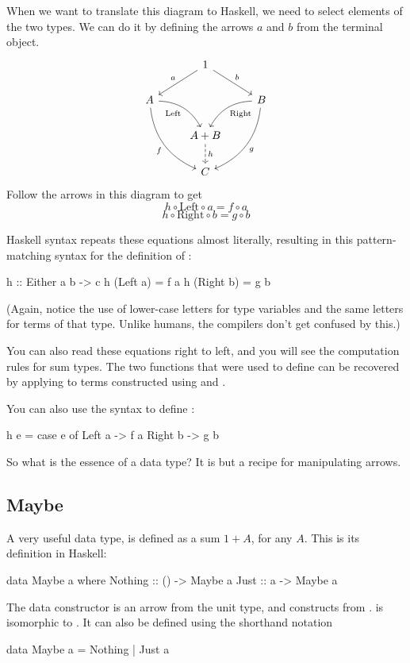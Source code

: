 \documentclass[DaoFP]{subfiles}
\begin{document}
When we want to translate this diagram to Haskell, we need to select elements of the two types. We can do it by defining the arrows $a$ and $b$ from the terminal object. 
\[
 \begin{tikzcd}
 &1
 \arrow[ld, "a"']
 \arrow[rd, "b"]
 \\
 A
 \arrow[dr,  bend left, "\text{Left}"']
 \arrow[ddr, bend right, "f"']
 && B
 \arrow[dl, bend right, "\text{Right}"]
 \arrow[ddl, bend left, "g"]
 \\
&A + B
\arrow[d, dashed, "h"]
\\
& C
 \end{tikzcd}
\]
Follow the arrows in this diagram to get
\[h \circ \text{Left} \circ a = f \circ a\]
\[h \circ \text{Right} \circ b = g \circ b\]

Haskell syntax repeats these equations almost literally, resulting in this pattern-matching syntax for the definition of :

\begin{haskell}
h :: Either a b -> c
h (Left  a) = f a
h (Right b) = g b
\end{haskell}
(Again, notice the use of lower-case letters for type variables and the same letters for terms of that type. Unlike humans, the compilers don't get confused by this.)

You can also read these equations right to left, and you will see the computation rules for sum types. The two functions that were used to define  can be recovered by applying  to terms constructed using  and . 

You can also use the  syntax to define :
\begin{haskell}
h e = case e of
  Left  a -> f a
  Right b -> g b
\end{haskell}

So what is the essence of a data type? It is but a recipe for manipulating arrows.

\subsection{Maybe}

A very useful data type,  is defined as a sum $1 + A$, for any $A$. This is its definition in Haskell:
\begin{haskell}
data Maybe a where
  Nothing :: () -> Maybe a
  Just    ::  a -> Maybe a
\end{haskell}
The data constructor  is an arrow from the unit type, and  constructs  from .  is isomorphic to . It can also be defined using the shorthand notation
\begin{haskell}
data Maybe a = Nothing | Just a
\end{haskell}
\end{document}
